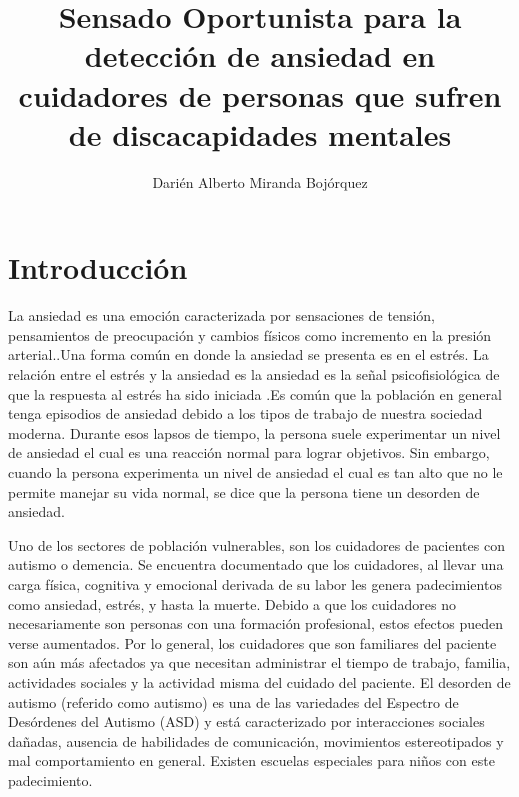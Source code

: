 \documentclass[letterpaper,12pt]{cicese}
\begin{document}
	\doublespace
	\title{Sensado Oportunista para la detecci\'on de ansiedad en cuidadores de personas que sufren de discacapidades mentales}
	\author{Dari\'en Alberto Miranda Boj\'orquez}
	\maketitle
        \maketitle
        \newpage
        \tableofcontents
        \newpage


                \chapter{Introducci\'on}
                        La ansiedad es una emoci\'on caracterizada por sensaciones de tensi\'on, pensamientos de preocupaci\'on y cambios f\'isicos como incremento en la presi\'on arterial.\citep{psychologyapa}.Una forma com\'un en donde la ansiedad se presenta es en el estr\'es. La relaci\'on entre el estr\'es y la ansiedad es la ansiedad es la se\~nal psicofisiol\'ogica de que la respuesta al estr\'es ha sido iniciada \citep{PMID2235645}.Es com\'un que la poblaci\'on en general tenga episodios de ansiedad debido a los tipos de trabajo de nuestra sociedad moderna. Durante esos lapsos de tiempo, la persona suele experimentar un nivel de ansiedad el cual es una reacci\'on normal para lograr objetivos. Sin embargo, cuando la persona experimenta un nivel de ansiedad el cual es tan alto que no le permite manejar su vida normal, se dice que la persona tiene un desorden de ansiedad\citep{repetto2013}.

                        Uno de los sectores de poblaci\'on vulnerables, son los cuidadores de pacientes con autismo o demencia. Se encuentra documentado que los cuidadores, al llevar una carga f\'isica, cognitiva y emocional derivada de su labor les genera padecimientos como ansiedad, estr\'es, y hasta la muerte\citep{Chen2013}. Debido a que los cuidadores no necesariamente son personas con una formaci\'on profesional, estos efectos pueden verse aumentados. Por lo general, los cuidadores que son familiares del paciente son a\'un m\'as afectados ya que necesitan administrar el tiempo de trabajo, familia, actividades sociales y la actividad misma del cuidado del paciente.
                        El desorden de autismo (referido como autismo) es una de las variedades del Espectro de Des\'ordenes del Autismo (ASD) y est\'a caracterizado por interacciones sociales da\~nadas, ausencia de habilidades de comunicaci\'on, movimientos estereotipados y mal comportamiento en general\citep{bernier2010autism}. Existen escuelas especiales para ni\~nos con este padecimiento.
\end{document}
